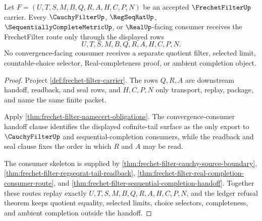 \begin{theorem}
\label{thm:frechet-filter-convergence-consumer-handoff-obligation}
Let $F=(U,T,S,M,B,Q,R,A,H,C,P,N)$ be an accepted $\FrechetFilterUp$ carrier. Every $\CauchyFilterUp$, $\RegSeqRatUp$, $\SequentiallyCompleteMetricUp$, or $\RealUp$-facing consumer receives the FrechetFilter route only through the displayed rows
$$
U,T,S,M,B,Q,R,A,H,C,P,N .
$$
No convergence-facing consumer receives a separate quotient filter, selected limit, countable-choice selector, Real-completeness proof, or ambient completion object.
\end{theorem}
\begin{proof}
Project \autoref{def:frechet-filter-carrier}. The rows $Q,R,A$ are downstream handoff, readback, and seal rows, and $H,C,P,N$ only transport, replay, package, and name the same finite packet.

Apply \autoref{thm:frechet-filter-namecert-obligations}. The convergence-consumer handoff clause identifies the displayed cofinite-tail surface as the only export to $\CauchyFilterUp$ and sequential-completion consumers, while the readback and seal clause fixes the order in which $R$ and $A$ may be read.

The consumer skeleton is supplied by \autoref{thm:frechet-filter-cauchy-source-boundary}, \autoref{thm:frechet-filter-regseqrat-tail-readback}, \autoref{thm:frechet-filter-real-completion-consumer-route}, and \autoref{thm:frechet-filter-sequential-completion-handoff}. Together these routes replay exactly $U,T,S,M,B,Q,R,A,H,C,P,N$, and the ledger refusal theorem keeps quotient equality, selected limits, choice selectors, completeness, and ambient completion outside the handoff.
\end{proof}

